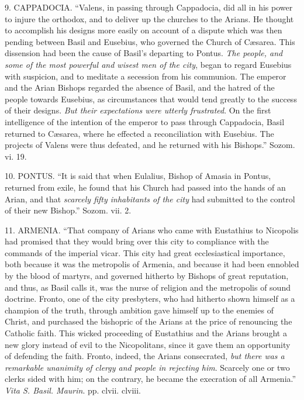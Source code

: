 9. CAPPADOCIA.
``Valens, in passing through Cappadocia, did all in his power to injure
the orthodox, and to deliver up the churches to the Arians. He thought
to accomplish his designs more easily on account of a dispute which was
then pending between Basil and Eusebius, who governed the Church of Cæsarea.
This dissension had been the cause of Basil's departing to Pontus. \emph{The
people, and some of the most powerful and wisest men of the city},
began to regard Eusebius with suspicion, and to meditate a secession
from his communion. The emperor and the Arian Bishops regarded the
absence of Basil, and the hatred of the people towards Eusebius, as
circumstances that would tend greatly to the success of their designs. \emph{But
their expectations were utterly frustrated}. On the first
intelligence of the intention of the emperor to pass through Cappadocia,
Basil returned to Cæsarea, where he effected a reconciliation with
Eusebius. The projects of Valens were thus defeated, and he
returned with his Bishops.'' Sozom. vi. 19.

10. PONTUS.
``It is said that when Eulalius, Bishop of Amasia in Pontus, returned
from exile, he found that his Church had passed into the hands of an
Arian, and that \emph{scarcely fifty inhabitants of the city} had
submitted to the control of their new Bishop.'' Sozom. vii. 2.

11. ARMENIA.
``That company of Arians who came with Eustathius to Nicopolis had
promised that they would bring over this city to compliance with the
commands of the imperial vicar. This city had great ecclesiastical
importance, both because it was the metropolis of Armenia, and because
it had been ennobled by the blood of martyrs, and governed hitherto by
Bishops of great reputation, and thus, as Basil calls it, was the nurse
of religion and the metropolis of sound doctrine. Fronto, one of the
city presbyters, who had hitherto shown himself as a champion of the
truth, through ambition gave himself up to the enemies of Christ, and
purchased the bishopric of the Arians at the price of renouncing the
Catholic faith. This wicked proceeding of Eustathius and the Arians
brought a new glory instead of evil to the Nicopolitans, since it gave
them an opportunity of defending the faith. Fronto, indeed, the Arians
consecrated, \emph{but there was a remarkable unanimity of clergy and
people in rejecting him}. Scarcely one or two clerks sided with him;
on the contrary, he became the execration of all Armenia.'' \emph{Vita S.
Basil. Maurin}. pp. clvii. clviii.


